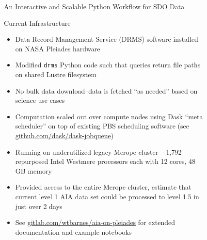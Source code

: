 \documentclass[final,12pt]{beamer}
\newlength{\sepwidth}
\newlength{\colwidth}
\newcommand{\separatorcolumn}{\begin{column}{\sepwidth}\end{column}}
\begin{document}
\begin{frame}[fragile,t]
\begin{columns}[T]
\begin{column}{\colwidth}
\begin{block}{An Interactive and Scalable Python Workflow for SDO Data}
  \end{block}

  \begin{block}{Current Infrastructure}
    \begin{itemize}
      \item Data Record Management Service (DRMS) software installed on NASA Pleiades hardware
      \item Modified \texttt{drms} Python code such that \alert{queries return file paths on shared Lustre filesystem}
      \item No bulk data download--data is fetched ``as needed'' based on science use cases
      \item Computation scaled out over compute nodes using Dask ``meta scheduler'' on top of existing PBS scheduling software (see \href{https://github.com/dask/dask-jobqueue}{github.com/dask/dask-jobqueue})
      \item Running on underutilized legacy Merope cluster -- 1,792 repurposed Intel Westmere processors each with \alert{12 cores, 48 GB memory}
      \item Provided access to the entire Merope cluster, \alert{estimate that current level 1 AIA data set could be processed to level 1.5 in just over 2 days}
      \item See \href{https://gitlab.com/wtbarnes/aia-on-pleiades}{gitlab.com/wtbarnes/aia-on-pleiades} for extended documentation and example notebooks
    \end{itemize}
  \end{block}

\end{column}

\separatorcolumn

\begin{column}{\colwidth}
  
  
\end{column}

\separatorcolumn

\begin{column}{\colwidth}
  
  \vspace{-3ex}
  


\end{column}
\end{columns}
\end{frame}
\end{document}
